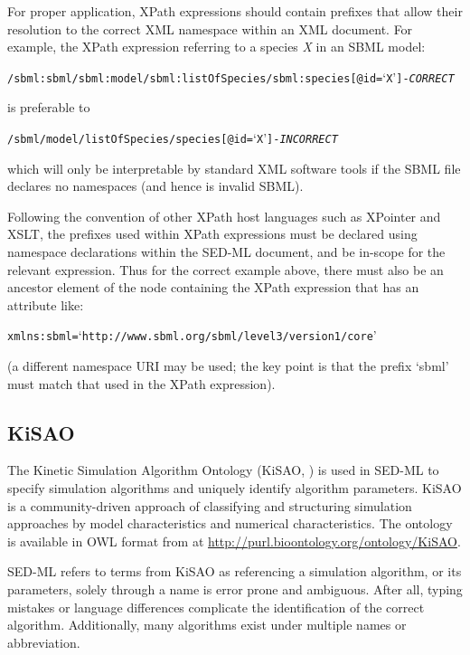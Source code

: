 For proper application, XPath expressions should contain prefixes that allow their resolution to the correct XML namespace within an XML document. For example, the XPath expression referring to a species \emph{X} in an SBML model:
\begin{alltt}
/sbml:sbml/sbml:model/sbml:listOfSpecies/sbml:species[@id=`X'] {\color{green} \tickYes -\emph{CORRECT}}
\end{alltt}
is preferable to 
\begin{alltt}
/sbml/model/listOfSpecies/species[@id=`X'] {\color{red} \tickNo -\emph{INCORRECT} }
\end{alltt}

which will only be interpretable by standard XML software tools if the SBML file declares no namespaces (and hence is invalid SBML).

Following the convention of other XPath host languages such as XPointer and XSLT, the prefixes used within XPath expressions must be declared using namespace declarations within the SED-ML document, and be in-scope for the relevant expression.
Thus for the correct example above, there must also be an ancestor element of the node containing the XPath expression that has an attribute like:
\begin{alltt}
xmlns:sbml=`http://www.sbml.org/sbml/level3/version1/core'
\end{alltt}
(a different namespace URI may be used; the key point is that the prefix `sbml' must match that used in the XPath expression).

\subsection{KiSAO}
\label{sec:kisao}

The Kinetic Simulation Algorithm Ontology (KiSAO, \citep{CWK+10}) is 
used in SED-ML to specify simulation algorithms and uniquely identify 
algorithm parameters. KiSAO is a community-driven approach of 
classifying and structuring simulation approaches by model 
characteristics and numerical characteristics. The ontology is available 
in OWL format from  at 
\url{http://purl.bioontology.org/ontology/KiSAO}. 

SED-ML refers to terms from KiSAO as referencing a simulation algorithm, 
or its parameters, solely through a name is error prone and ambiguous. 
After all, typing mistakes or language differences complicate the 
identification of the correct algorithm. Additionally, many algorithms 
exist under multiple names or abbreviation. 

